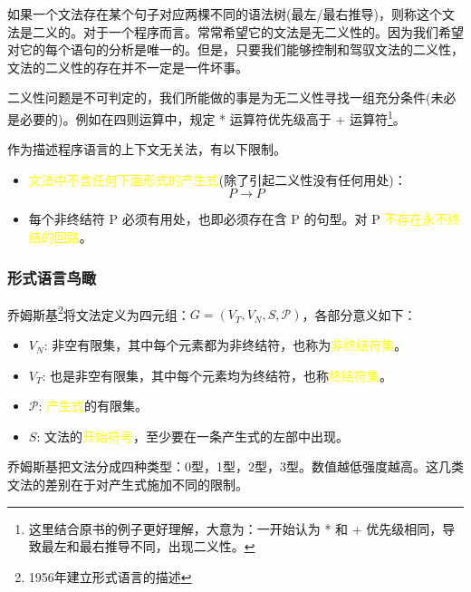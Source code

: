 \textcolor{tip}{如果一个文法存在某个句子对应两棵不同的语法树(最左/最右推导)，则称这个文法是二义的}。对于一个程序而言。常常希望它的文法是无二义性的。因为我们希望对它的每个语句的分析是唯一的。但是，只要我们能够控制和驾驭文法的二义性，\textcolor{tip}{文法的二义性的存在并不一定是一件坏事}。

二义性问题是不可判定的，我们所能做的事是为无二义性寻找一组充分条件(未必是必要的)。例如在四则运算中，规定 * 运算符优先级高于 + 运算符\footnote{这里结合原书的例子更好理解，大意为：一开始认为 * 和 + 优先级相同，导致最左和最右推导不同，出现二义性。}。

作为描述程序语言的上下文无关法，有以下限制。

\begin{itemize}
    \item \textcolor{mark}{文法中不含任何下面形式的产生式}(除了引起二义性没有任何用处)：
    \[P \rightarrow P\]
    \item 每个非终结符 P 必须有用处，也即必须存在含 P 的句型。对 P \textcolor{mark}{不存在永不终结的回路}。
\end{itemize}

\subsubsection{形式语言鸟瞰}

乔姆斯基\footnote{1956年建立形式语言的描述}将文法定义为四元组：$G=(V_T,V_N,S,\mathcal{P})$，各部分意义如下：
\begin{itemize}
    \item $V_N$: 非空有限集，其中每个元素都为非终结符，也称为\textcolor{mark}{非终结符集}。
    \item $V_T$: 也是非空有限集，其中每个元素均为终结符，也称\textcolor{mark}{终结符集}。
    \item $\mathcal{P}$: \textcolor{mark}{产生式}的有限集。
    \item $S$: 文法的\textcolor{mark}{开始符号}，至少要在一条产生式的左部中出现。
\end{itemize}

乔姆斯基把文法分成四种类型：0型，1型，2型，3型。数值越低强度越高。这几类文法的差别在于对产生式施加不同的限制。



